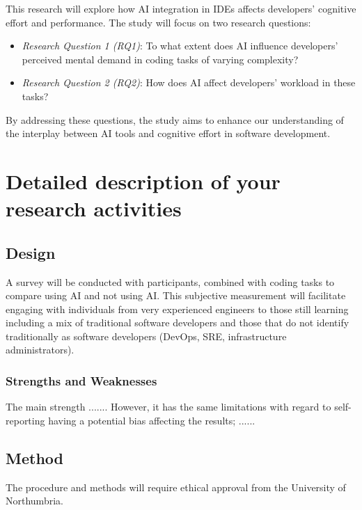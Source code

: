 \documentclass[man]{apa7}
\begin{document}
This research will explore how AI integration in IDEs affects developers' cognitive effort and performance. The study will focus on two research questions:

\begin{itemize}
    \item \emph{Research Question 1 (RQ1)}: To what extent does AI influence developers' perceived mental demand in coding tasks of varying complexity?
    \item \emph{Research Question 2 (RQ2)}: How does AI affect developers' workload in these tasks?
\end{itemize}

By addressing these questions, the study aims to enhance our understanding of the interplay between AI tools and cognitive effort in software development.
   


\section{Detailed description of your research activities}
\subsection{Design}

A survey will be conducted with participants, combined with coding tasks to compare using AI and not using AI. This subjective measurement will facilitate engaging with individuals from very experienced engineers to those still learning including a mix of traditional software developers and those that do not identify traditionally as software developers (DevOps, SRE, infrastructure administrators).

\subsubsection{Strengths and Weaknesses}
The main strength ....... However, it has the same limitations with regard to self-reporting having a potential bias affecting the results;  ......

\subsection{Method}
The procedure and methods will require ethical approval from the University of Northumbria.
\end{document}
